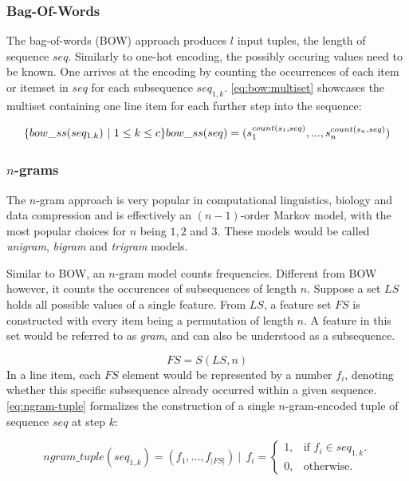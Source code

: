 \subsubsection*{Bag-Of-Words}
The bag-of-words (BOW) approach produces $l$ input tuples, the length of sequence $seq$. Similarly to one-hot encoding, the possibly occuring values need to be known. One arrives at the encoding by counting the occurrences of each item or itemset in $seq$ for each subsequence $seq_{1,k}$. \autoref{eq:bow:multiset} showcases the multiset containing one line item for each further step into the sequence:

\begin{equation}
    \label{eq:bow:multiset}
    \{ bow\_ss(seq_{1,k})\ |\ 1 \leq k \leq c \} \\
    bow\_ss(seq) = ( s_1^{count(s_1,seq)}, ..., s_n^{count(s_n,seq)} )
\end{equation}

\subsubsection*{$n$-grams}
The $n$-gram approach is very popular in computational linguistics, biology and data compression and is effectively an $(n-1)$-order Markov model, with the most popular choices for $n$ being $1,2$ and $3$. These models would be called \textit{unigram}, \textit{bigram} and \textit{trigram} models.

Similar to BOW, an $n$-gram model counts frequencies. Different from BOW however, it counts the occurences of subsequences of length $n$. Suppose a set $LS$ holds all possible values of a single feature. From $LS$, a feature set $FS$ is constructed with every item being a permutation of length $n$. A feature in this set would be referred to as \textit{gram}, and can also be understood as a subsequence.

$$
FS = S(LS, n)
$$
In a line item, each $FS$ element would be represented by a number $f_i$, denoting whether this specific subsequence already occurred within a given sequence. \autoref{eq:ngram-tuple} formalizes the construction of a single $n$-gram-encoded tuple of sequence $seq$ at step $k$:

\begin{equation}\label{eq:ngram-tuple}
    ngram\_tuple(seq_{1,k}) = (f_1, ..., f_{|FS|})\ |\ \ f_i = 
    \begin{cases}
    1, & \text{if $f_i \in seq_{1,k}$}.\\
    0, & \text{otherwise}.
    \end{cases}
\end{equation}

